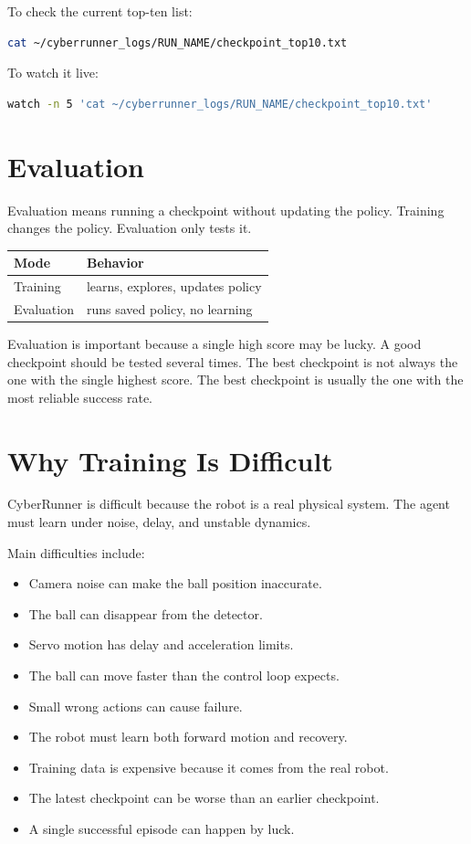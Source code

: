 \documentclass[11pt]{article}
\begin{document}
To check the current top-ten list:

\begin{lstlisting}[language=bash]
cat ~/cyberrunner_logs/RUN_NAME/checkpoint_top10.txt
\end{lstlisting}

To watch it live:

\begin{lstlisting}[language=bash]
watch -n 5 'cat ~/cyberrunner_logs/RUN_NAME/checkpoint_top10.txt'
\end{lstlisting}

\section{Evaluation}

Evaluation means running a checkpoint without updating the policy. Training changes the policy. Evaluation only tests it.

\begin{center}
\begin{tabular}{ll}
\toprule
Mode & Behavior \\
\midrule
Training & learns, explores, updates policy \\
Evaluation & runs saved policy, no learning \\
\bottomrule
\end{tabular}
\end{center}

Evaluation is important because a single high score may be lucky. A good checkpoint should be tested several times. The best checkpoint is not always the one with the single highest score. The best checkpoint is usually the one with the most reliable success rate.

\section{Why Training Is Difficult}

CyberRunner is difficult because the robot is a real physical system. The agent must learn under noise, delay, and unstable dynamics.

Main difficulties include:

\begin{itemize}[leftmargin=*]
  \item Camera noise can make the ball position inaccurate.
  \item The ball can disappear from the detector.
  \item Servo motion has delay and acceleration limits.
  \item The ball can move faster than the control loop expects.
  \item Small wrong actions can cause failure.
  \item The robot must learn both forward motion and recovery.
  \item Training data is expensive because it comes from the real robot.
  \item The latest checkpoint can be worse than an earlier checkpoint.
  \item A single successful episode can happen by luck.
\end{itemize}
\end{document}

